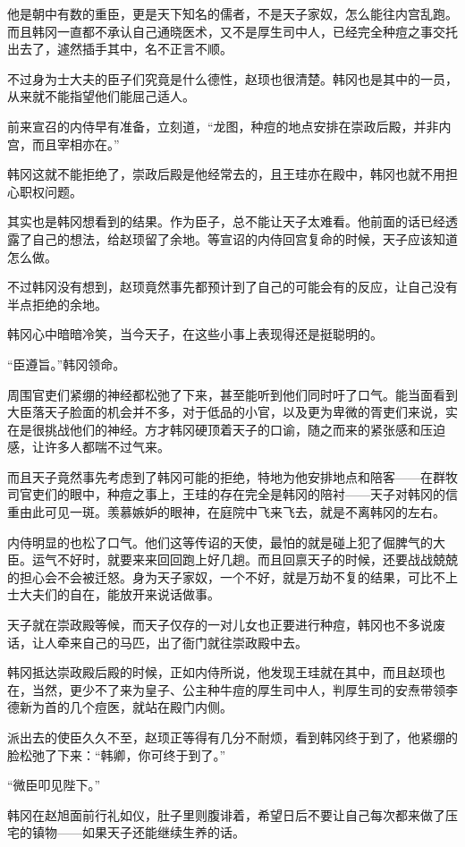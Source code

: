 他是朝中有数的重臣，更是天下知名的儒者，不是天子家奴，怎么能往内宫乱跑。而且韩冈一直都不承认自己通晓医术，又不是厚生司中人，已经完全种痘之事交托出去了，遽然插手其中，名不正言不顺。

不过身为士大夫的臣子们究竟是什么德性，赵顼也很清楚。韩冈也是其中的一员，从来就不能指望他们能屈己适人。

前来宣召的内侍早有准备，立刻道，“龙图，种痘的地点安排在崇政后殿，并非内宫，而且宰相亦在。”

韩冈这就不能拒绝了，崇政后殿是他经常去的，且王珪亦在殿中，韩冈也就不用担心职权问题。

其实也是韩冈想看到的结果。作为臣子，总不能让天子太难看。他前面的话已经透露了自己的想法，给赵顼留了余地。等宣诏的内侍回宫复命的时候，天子应该知道怎么做。

不过韩冈没有想到，赵顼竟然事先都预计到了自己的可能会有的反应，让自己没有半点拒绝的余地。

韩冈心中暗暗冷笑，当今天子，在这些小事上表现得还是挺聪明的。

“臣遵旨。”韩冈领命。

周围官吏们紧绷的神经都松弛了下来，甚至能听到他们同时吁了口气。能当面看到大臣落天子脸面的机会并不多，对于低品的小官，以及更为卑微的胥吏们来说，实在是很挑战他们的神经。方才韩冈硬顶着天子的口谕，随之而来的紧张感和压迫感，让许多人都喘不过气来。

而且天子竟然事先考虑到了韩冈可能的拒绝，特地为他安排地点和陪客——在群牧司官吏们的眼中，种痘之事上，王珪的存在完全是韩冈的陪衬——天子对韩冈的信重由此可见一斑。羡慕嫉妒的眼神，在庭院中飞来飞去，就是不离韩冈的左右。

内侍明显的也松了口气。他们这等传诏的天使，最怕的就是碰上犯了倔脾气的大臣。运气不好时，就要来来回回跑上好几趟。而且回禀天子的时候，还要战战兢兢的担心会不会被迁怒。身为天子家奴，一个不好，就是万劫不复的结果，可比不上士大夫们的自在，能放开来说话做事。

天子就在崇政殿等候，而天子仅存的一对儿女也正要进行种痘，韩冈也不多说废话，让人牵来自己的马匹，出了衙门就往崇政殿中去。

韩冈抵达崇政殿后殿的时候，正如内侍所说，他发现王珪就在其中，而且赵顼也在，当然，更少不了来为皇子、公主种牛痘的厚生司中人，判厚生司的安焘带领李德新为首的几个痘医，就站在殿门内侧。

派出去的使臣久久不至，赵顼正等得有几分不耐烦，看到韩冈终于到了，他紧绷的脸松弛了下来：“韩卿，你可终于到了。”

“微臣叩见陛下。”

韩冈在赵旭面前行礼如仪，肚子里则腹诽着，希望日后不要让自己每次都来做了压宅的镇物——如果天子还能继续生养的话。

